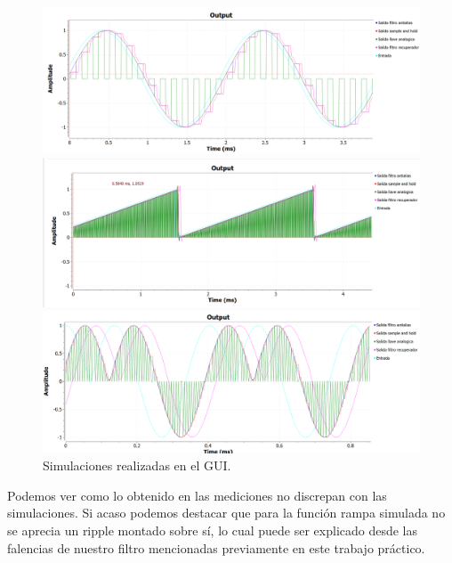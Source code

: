 \documentclass[../../ASSD_TP1_G7.tex]{subfiles}
\begin{document}
\begin{figure}[H]

\begin{centering}
\includegraphics[scale=0.5]{Imagenes/simulacion_syh_seno_a.PNG}
\par\end{centering}
\begin{centering}
\includegraphics[scale=0.5]{Imagenes/simulacion_syh_diente_a.PNG}
\par\end{centering}
\begin{centering}
\includegraphics[scale=0.5]{Imagenes/simulacion_syh_senoraro_a.PNG}\caption{Simulaciones realizadas en el GUI.}
\par\end{centering}
\end{figure}

Podemos ver como lo obtenido en las mediciones no discrepan con las
simulaciones. Si acaso podemos destacar que para la función rampa
simulada no se aprecia un ripple montado sobre sí, lo cual puede ser
explicado desde las falencias de nuestro filtro mencionadas previamente
en este trabajo práctico.
\end{document}

